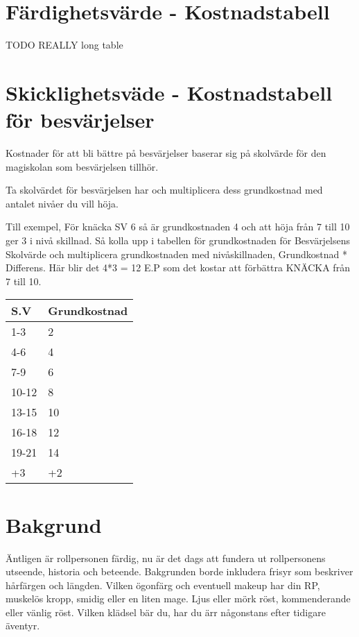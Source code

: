 \documentclass[a4paper, 10pt, titlepage]{article}
\begin{document}
\section{Färdighetsvärde - Kostnadstabell}
TODO REALLY long table

\section{Skicklighetsväde - Kostnadstabell för besvärjelser}
Kostnader för att bli bättre på besvärjelser baserar sig på skolvärde för den magiskolan
som besvärjelsen tillhör.

Ta skolvärdet för besvärjelsen har och multiplicera dess grundkostnad med antalet nivåer
du vill höja.

Till exempel, För knäcka SV 6 så är grundkostnaden 4 och att höja från 7 till 10 ger 3 i nivå skillnad.
Så kolla upp i tabellen för grundkostnaden för Besvärjelsens Skolvärde och multiplicera
grundkostnaden med nivåskillnaden, Grundkostnad * Differens. Här blir det 4*3 = 12 E.P som det kostar
att förbättra KNÄCKA från 7 till 10.

\begin{table}[hbp]
  \begin{tabular}{|l|l|}
    \hline
    S.V  &   Grundkostnad \\
    \hline
    1-3   & 2 \\
    \hline
    4-6   & 4 \\
    \hline
    7-9   & 6 \\
    \hline
    10-12 & 8 \\
    \hline
    13-15 & 10 \\
    \hline
    16-18 & 12 \\
    \hline
    19-21 & 14 \\
    \hline
    +3    & +2 \\
    \hline
  \end{tabular}
\end{table}

\section{Bakgrund}
Äntligen är rollpersonen färdig, nu är det dags att fundera ut rollpersonens
utseende, historia och beteende. Bakgrunden borde inkludera frisyr som beskriver
hårfärgen och längden. Vilken ögonfärg och eventuell makeup har din RP, muskelös
kropp, smidig eller en liten mage. Ljus eller mörk röst, kommenderande eller vänlig röst.
Vilken klädsel bär du, har du ärr någonstans efter tidigare äventyr.
\end{document}
